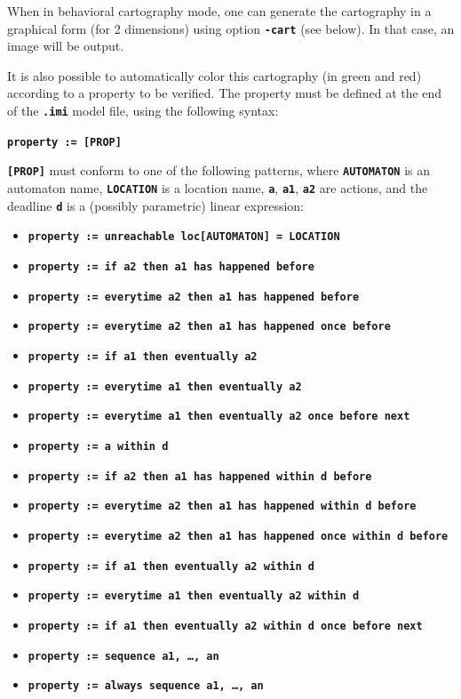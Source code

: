 \documentclass[a4paper,11pt]{report}
\newcommand{\code}[1]{\textbf{\texttt{#1}}}
\begin{document}
When in behavioral cartography mode, one can generate the cartography in a graphical form (for 2 dimensions) using option \code{-cart} (see below).
In that case, an image will be output.

It is also possible to automatically color this cartography (in green and red) according to a property to be verified.
The property must be defined at the end of the \code{.imi} model file, using the following syntax:

\code{property := [PROP]}

\code{[PROP]} must conform to one of the following patterns, where \code{AUTOMATON} is an automaton name, \code{LOCATION} is a location name, \code{a}, \code{a1}, \code{a2} are actions, and the deadline \code{d} is a (possibly parametric) linear expression:

\begin{itemize}
	\item \code{property := unreachable loc[AUTOMATON] = LOCATION}
	\item \code{property := if a2 then a1 has happened before}
	\item \code{property := everytime a2 then a1 has happened before}
	\item \code{property := everytime a2 then a1 has happened once before}
	\item \code{property := if a1 then eventually a2}
	\item \code{property := everytime a1 then eventually a2}
	\item \code{property := everytime a1 then eventually a2 once before next}
	\item \code{property := a within d}
	\item \code{property := if a2 then a1 has happened within d before}
	\item \code{property := everytime a2 then a1 has happened within d before}
	\item \code{property := everytime a2 then a1 has happened once within d before}
	\item \code{property := if a1 then eventually a2 within d}
	\item \code{property := everytime a1 then eventually a2 within~d}
	\item \code{property := if a1 then eventually a2 within d once before next}
	\item \code{property := sequence a1, \dots, an}
	\item \code{property := always sequence a1, \dots, an}
\end{itemize}
\end{document}
